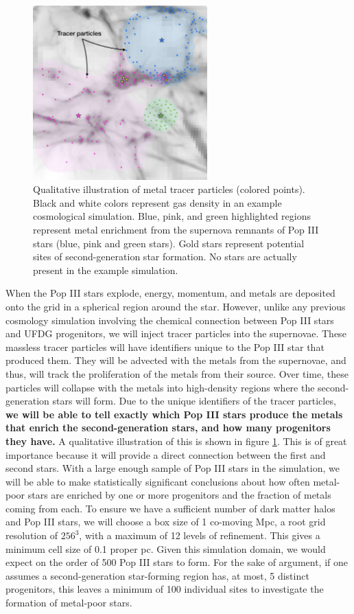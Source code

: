 \documentclass[letterpaper, 12pt]{article}
\begin{document}
\begin{figure}
  \includegraphics[width=0.6\textwidth]{figures/tracer_final}
  \caption{Qualitative illustration of metal tracer particles (colored points). Black and white colors represent gas density in an example cosmological simulation. Blue, pink, and green highlighted regions represent metal enrichment from the supernova remnants of Pop III stars (blue, pink and green stars). Gold stars represent potential sites of second-generation star formation. No stars are actually present in the example simulation.}
  \label{fig:tracer}    
\end{figure}

When the Pop III stars explode, energy, momentum, and metals are deposited onto the grid in a spherical region around the star. However, unlike any previous cosmology simulation involving the chemical connection between Pop III stars and UFDG progenitors, we will inject tracer particles into the supernovae. These massless tracer particles will have identifiers unique to the Pop III star that produced them. They will be advected with the metals from the supernovae, and thus, will track the proliferation of the metals from their source. Over time, these particles will collapse with the metals into high-density regions where the second-generation stars will form. Due to the unique identifiers of the tracer particles, \textbf{we will be able to tell exactly which Pop III stars produce the metals that enrich the second-generation stars, and how many progenitors they have.} A qualitative illustration of this is shown in figure \ref{fig:tracer}. This is of great importance because it will provide a direct connection between the first and second stars. With a large enough sample of Pop III stars in the simulation, we will be able to make statistically significant conclusions about how often metal-poor stars are enriched by one or more progenitors and the fraction of metals coming from each. To ensure we have a sufficient number of dark matter halos and Pop III stars, we will choose a box size of 1 co-moving Mpc, a root grid resolution of $256^3$, with a maximum of 12 levels of refinement. This gives a minimum cell size of 0.1 proper pc. Given this simulation domain, we would expect on the order of 500 Pop III stars to form. For the sake of argument, if one assumes a second-generation star-forming region has, at most, 5 distinct progenitors, this leaves a minimum of 100 individual sites to investigate the formation of metal-poor stars.
\end{document}
